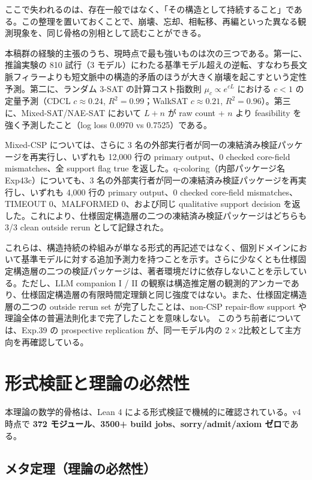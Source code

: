 \documentclass[12pt,a4paper]{article}
\begin{document}
ここで失われるのは、存在一般ではなく、「その構造として持続すること」である。この整理を置いておくことで、崩壊、忘却、相転移、再編といった異なる観測現象を、同じ骨格の別相として読むことができる。

本稿群の経験的主張のうち、現時点で最も強いものは次の三つである。第一に、推論実験の 810 試行（3 モデル）にわたる基準モデル超えの逆転、すなわち長文脈フィラーよりも短文脈中の構造的矛盾のほうが大きく崩壊を起こすという定性予測。第二に、ランダム 3-SAT の計算コスト指数則 \(\mu_c \propto e^{cL}\) における \(c < 1\) の定量予測（CDCL \(c \approx 0.24\), \(R^2 = 0.99\)；WalkSAT \(c \approx 0.21\), \(R^2 = 0.96\)）。第三に、Mixed-SAT/NAE-SAT において \(L+n\) が raw count + \(n\) より feasibility を強く予測したこと（log loss 0.0970 vs 0.7525）である。

Mixed-CSP については、さらに 3 名の外部実行者が同一の凍結済み検証パッケージを再実行し、いずれも 12,000 行の primary output、0 checked core-field mismatches、全 support flag true を返した。q-coloring（内部パッケージ名 Exp43c）についても、3 名の外部実行者が同一の凍結済み検証パッケージを再実行し、いずれも 4,000 行の primary output、0 checked core-field mismatches、TIMEOUT 0、MALFORMED 0、および同じ qualitative support decision を返した。これにより、仕様固定構造層の二つの凍結済み検証パッケージはどちらも 3/3 clean outside rerun として記録された。

これらは、構造持続の枠組みが単なる形式的再記述ではなく、個別ドメインにおいて基準モデルに対する追加予測力を持つことを示す。さらに少なくとも仕様固定構造層の二つの検証パッケージは、著者環境だけに依存しないことを示している。ただし、LLM companion I / II の観察は構造推定層の観測的アンカーであり、仕様固定構造層の有限時間定理鎖と同じ強度ではない。また、仕様固定構造層の二つの outside rerun set が完了したことは、non-CSP repair-flow support や理論全体の普遍法則化まで完了したことを意味しない。 このうち前者については、Exp.39 の prospective replication が、同一モデル内の \(2\times2\)比較として主方向を再確認している。

\section{形式検証と理論の必然性}\label{ux5f62ux5f0fux691cux8a3cux3068ux7406ux8ad6ux306eux5fc5ux7136ux6027}

本理論の数学的骨格は、Lean 4 による形式検証で機械的に確認されている。v4 時点で \textbf{372 モジュール}、\textbf{3500+ build jobs}、\textbf{sorry/admit/axiom ゼロ}である。

\subsection{メタ定理（理論の必然性）}\label{ux30e1ux30bfux5b9aux7406ux7406ux8ad6ux306eux5fc5ux7136ux6027}
\end{document}

